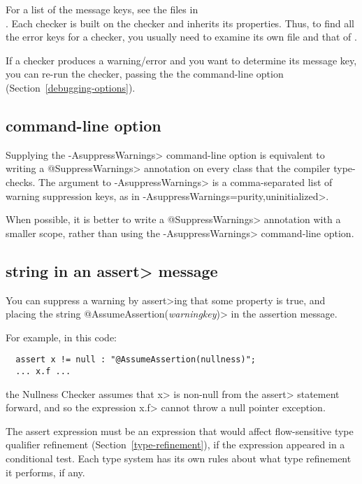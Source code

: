 \noindent
For a list of the message keys, 
see the  files in 
\\
.
Each checker is built on the  checker and inherits its
properties.  Thus, to find all the error keys for a checker, you usually
need to examine its own  file and that of
.

If a checker produces a warning/error and you want to determine its message
key, you can re-run the checker, passing the the 
command-line option (Section~\ref{debugging-options}).


\subsection{ command-line option\label{suppresswarnings-command-line}}

Supplying the \<-AsuppressWarnings> command-line option is equivalent to
writing a \<@SuppressWarnings> annotation on every class that the compiler
type-checks.  The argument to \<-AsuppressWarnings> is a comma-separated
list of warning suppression keys, as in
\<-AsuppressWarnings=purity,uninitialized>.

When possible, it is better to write a \<@SuppressWarnings> annotation with a
smaller scope, rather than using the \<-AsuppressWarnings> command-line option.


\subsection{ string in an \<assert> message\label{assumeassertion}}

You can suppress a warning by \<assert>ing that some property is true, and
placing the string \<@AssumeAssertion(\emph{warningkey})> in the assertion
message.

For example, in this code:

\begin{Verbatim}
  assert x != null : "@AssumeAssertion(nullness)";
  ... x.f ...
\end{Verbatim}

\noindent
the Nullness Checker assumes that \<x> is non-null from the \<assert>
statement forward, and so the expression \<x.f> cannot throw a null pointer
exception.

The assert expression must be an expression that would affect flow-sensitive
type qualifier refinement (Section~\ref{type-refinement}), if the
expression appeared in a conditional test.  Each type system has its own
rules about what type refinement it performs, if any.

